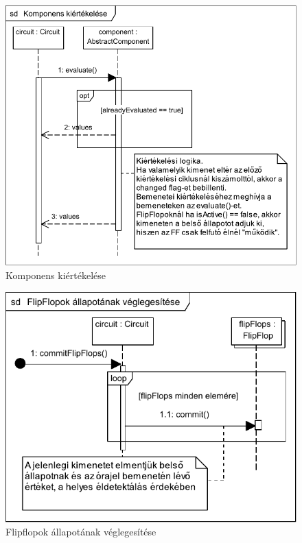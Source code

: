 \begin{figure}[H]
\begin{center}
\includegraphics{chapters/chapter04/seqdiagrams/new/evaluate.pdf}
\caption{Komponens kiértékelése}
\label{fig:evaluate}
\end{center}
\end{figure}

\begin{figure}[H]
\begin{center}
\includegraphics{chapters/chapter04/seqdiagrams/new/commitFlipFlops.pdf}
\caption{Flipflopok állapotának véglegesítése}
\label{fig:commitFlipFlops}
\end{center}
\end{figure}

